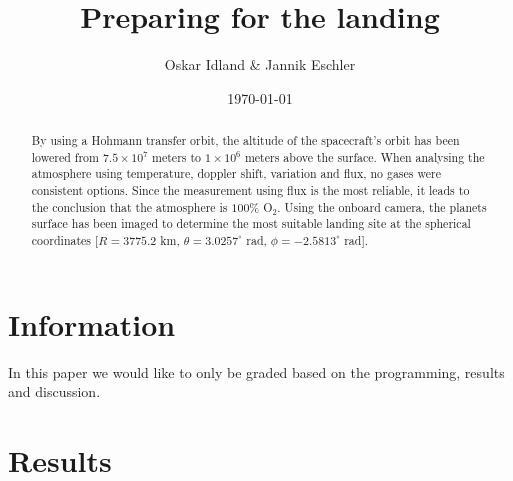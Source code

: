 \documentclass[reprint,english,notitlepage]{revtex4-2}
\begin{document}
\title{Preparing for the landing}
\author{Oskar Idland \& Jannik Eschler}
\date{\today}

\begin{abstract}
    By using a Hohmann transfer orbit, the altitude of the spacecraft's orbit has been lowered from $7.5 \times 10^7$ meters to $1 \times 10^6$ meters above the surface.
    When analysing the atmosphere using temperature, doppler shift, variation and flux, no gases were consistent options.
    Since the measurement using flux is the most reliable, it leads to the conclusion that the atmosphere is $100\%$ O$_2$.
    Using the onboard camera, the planets surface has been imaged to determine the most suitable landing site at the spherical coordinates [$R = 3775.2$ km, $\theta = 3.0257^{\circ}$ rad, $\phi = -2.5813^{\circ}$ rad].
\end{abstract}

\maketitle
\onecolumngrid
\section{Information} \label{sec:info}
\begin{center}
    In this paper we would like to only be graded based on the programming, results and discussion.
\end{center}

\section{Results} \label{sec: results}
\end{document}

